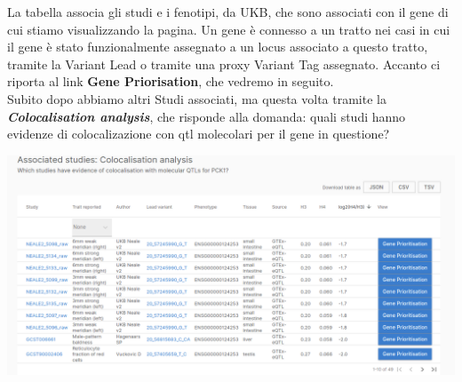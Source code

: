 \documentclass{article}
\begin{document}
La tabella associa gli studi e i fenotipi, da UKB, che sono associati con il gene di cui stiamo visualizzando la pagina. Un gene è connesso a un tratto nei casi in cui il gene è stato funzionalmente assegnato a un locus associato a questo tratto, tramite la Variant Lead o tramite una proxy Variant Tag assegnato. Accanto ci riporta al link \textbf{Gene Priorisation}, che vedremo in seguito.\\
Subito dopo abbiamo altri Studi associati, ma questa volta tramite la \textit{\textbf{Colocalisation analysis}}, che risponde alla domanda: quali studi hanno evidenze di colocalizazione con qtl molecolari per il gene in questione?
\begin{center}
    \includegraphics[width=1\textwidth]{figures/3-Gene.png}
\end{center}
\end{document}
